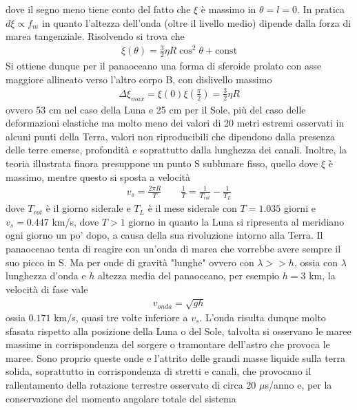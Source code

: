 \documentclass[a4paper, oneside]{book}
\begin{document}
dove il segno meno tiene conto del fatto che $\xi$ è massimo in $\theta = l= 0$. In pratica
$d\xi \propto f_m$ in quanto l'altezza dell'onda (oltre il livello medio) 
dipende dalla forza di marea tangenziale. Risolvendo si trova che 
\begin{gather*}
    \xi(\theta) = \frac{3}{2}\eta R\cos^{2}\theta + \text{const}
\end{gather*}
Si ottiene dunque per il panaoceano una forma di sferoide prolato con asse maggiore 
allineato verso l'altro corpo B, con dislivello massimo 
\begin{gather*}
    \Delta \xi_{max } = \xi(0) \xi\left(\frac{\pi}{2}\right) = \frac{3}{2}\eta R 
\end{gather*}
ovvero 53 cm nel caso della Luna e 25 cm per il Sole, più del caso delle deformazioni elastiche 
ma molto meno dei valori di 20 metri estremi osservati in alcuni punti 
della Terra, valori non riproducibili che dipendono dalla presenza 
delle terre emerse, profondità e soprattutto dalla lunghezza dei canali.
Inoltre, la teoria illustrata finora presuppone un punto S 
sublunare fisso, quello dove $\xi$ è massimo, mentre questo si sposta a velocità 
\begin{gather*}
    v_s = \frac{2\pi R}{T} \qquad \frac{1}{T} = \frac{1}{T_{rot}} - \frac{1}{T_L}
\end{gather*}
dove $T_{rot}$ è il giorno siderale e $T_L$ è il mese siderale con 
$T = 1.035$ giorni e $v_s = 0.447$ km/s, dove $T > 1$ giorno in quanto la 
Luna si ripresenta al meridiano ogni giorno un po' dopo, 
a causa della sua rivoluzione intorno alla Terra. Il panaocenao
tenta di reagire con un'onda di marea che vorrebbe avere sempre il suo picco in S. 
Ma per onde di gravità "lunghe" ovvero con  $\lambda >> h$, ossia 
con $\lambda$ lunghezza d'onda e $h$ altezza media del panaoceano, per esempio 
$h = 3$ km, la velocità di fase vale 
\begin{gather*}
    v_{onda} = \sqrt{gh} 
\end{gather*}
ossia $0.171$ km/s, quasi tre volte inferiore a $v_s$. L'onda
risulta dunque molto sfasata rispetto alla posizione della Luna o del Sole, 
talvolta si osservano le maree massime in corrispondenza del sorgere o tramontare dell'astro che 
provoca le maree. Sono proprio queste onde e l'attrito 
delle grandi masse liquide sulla terra solida, soprattutto in corrispondenza 
di stretti e canali, che provocano il rallentamento della rotazione terrestre osservato 
di circa 20 $\mu$s/anno e, per la conservazione del momento angolare totale del sistema 
\end{document}
